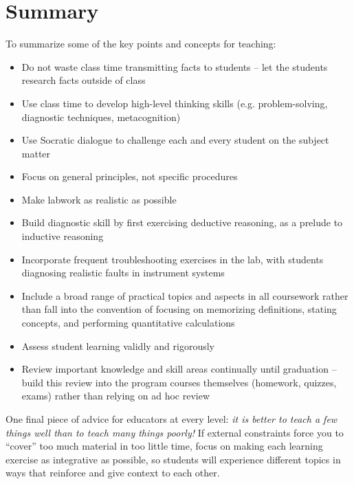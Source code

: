 \filbreak
\section{Summary}

To summarize some of the key points and concepts for teaching:

\begin{itemize}
\item Do not waste class time transmitting facts to students -- let the students research facts outside of class
\item Use class time to develop high-level thinking skills (e.g. problem-solving, diagnostic techniques, metacognition)
\item Use Socratic dialogue to challenge each and every student on the subject matter
\item Focus on general principles, not specific procedures
\item Make labwork as realistic as possible
\item Build diagnostic skill by first exercising deductive reasoning, as a prelude to inductive reasoning
\item Incorporate frequent troubleshooting exercises in the lab, with students diagnosing realistic faults in instrument systems
\item Include a broad range of practical topics and aspects in all coursework rather than fall into the convention of focusing on memorizing definitions, stating concepts, and performing quantitative calculations
\item Assess student learning validly and rigorously
\item Review important knowledge and skill areas continually until graduation -- build this review into the program courses themselves (homework, quizzes, exams) rather than relying on ad hoc review
\end{itemize}

One final piece of advice for educators at every level: \textit{it is better to teach a few things well than to teach many things poorly!}  If external constraints force you to ``cover'' too much material in too little time, focus on making each learning exercise as integrative as possible, so students will experience different topics in ways that reinforce and give context to each other.












%

